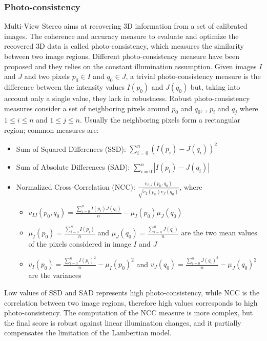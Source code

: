 \subsubsection{Photo-consistency}
Multi-View Stereo aims at recovering 3D information from a set of calibrated images. The coherence and accuracy measure to evaluate and optimize the recovered 3D data is called photo-consistency, which measures the similarity between two image regions.
Different photo-consistency measure have been proposed and they relies on the constant illumination assumption. 
Given images $I$ and $J$ and two pixels $p_0\in I$ and $q_0\in J$, a trivial photo-consistency measure is the difference between the intensity values  $I(p_0)$ and $J(q_0)$ but, taking into account only a single value, they lack in robustness. 
Robust photo-consistency measures consider a set of neighboring  pixels around $p_0$ and $q_0$, \ie, $p_i$ and $q_j$ where $1\leq i \leq n$ and $1\leq j \leq n$. Usually the neighboring pixels form a rectangular region; common measures are:
\begin{itemize}
  \item Sum of Squared Differences (SSD): $\sum_{i=0}^{n}(I(p_i) - J(q_i))^2$
  \item Sum of Absolute Differences (SAD): $\sum_{i=0}^{n}|I(p_i) - J(q_i)|$
  \item Normalized Cross-Correlation (NCC): $\frac{v_{I,J}(p_0,q_0)}{\sqrt{v_{I}(p_0) v_{J}(q_0)}}$,
  where 
  \begin{itemize}
    \item $v_{IJ}(p_0,q_0) = \frac{\sum_{i=0}^{n}I(p_i)J(q_i)}{n} - \mu_I(p_0) \mu_{J}(q_0)$
    \item $\mu_{I}(p_0) = \frac{\sum_{i=0}^{n}I(p_i)}{n}$ and $\mu_{J}(q_0) = \frac{\sum_{i=0}^{n}J(q_i)}{n}$ are the two mean values of the pixels considered in image $I$ and $J$
    \item $v_{I}(p_0) = \frac{\sum_{i=0}^{n}I(p_i)^2}{n} - \mu_I(p_0)^2$ and $v_{J}(q_0) = \frac{\sum_{i=0}^{n}J(q_i)^2}{n} - \mu_{J}(q_0)^2$ are the variances
  \end{itemize}
\end{itemize}
Low values of SSD and SAD represents high photo-consistency, while NCC is the correlation between two image regions, therefore high values corresponds to high photo-consistency. 
The computation of the NCC measure is more complex, but the final score is robust against linear illumination changes, and it partially compensates the limitation of the Lambertian model.


